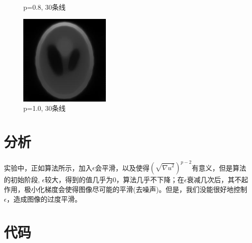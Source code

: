 \documentclass{ctexart}
\begin{document}
\begin{figure}[H]
\begin{minipage}[t]{0.4\linewidth}
\caption{\small p=0.8, 30条线}%
\label{fig: Figure7}
\end{minipage} 
\hfill
\begin{minipage}[t]{0.4\linewidth}
\centering
\includegraphics[width=4.5cm]{assets/10-30}
\caption{\small p=1.0, 30条线}%
\label{fig: Figure8}
\end{minipage}
\end{figure}

\section{分析}

实验中，正如算法所示，加入$\epsilon$会平滑，以及使得$ (\sqrt{{\nabla u}^2})^{p-2}$有意义，但是算法的初始阶段, $\epsilon$较大，得到的值几乎为0，算法几乎不下降；在$\epsilon$衰减几次后，其不起作用，极小化梯度会使得图像尽可能的平滑(去噪声)。但是，我们没能很好地控制$\epsilon$，造成图像的过度平滑。

\section{代码}
\end{document}
